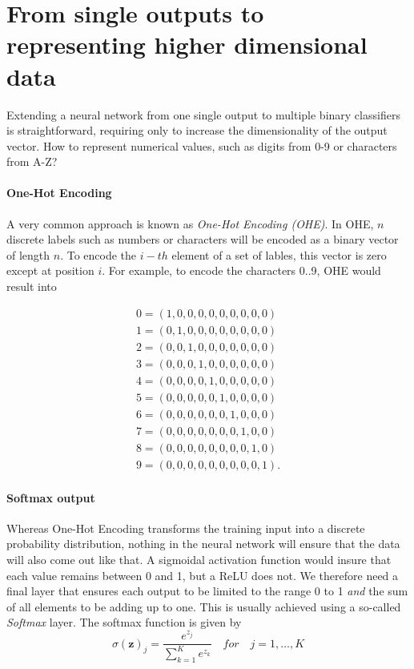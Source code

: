 \section{From single outputs to representing higher dimensional data}
Extending a neural network from one single output to multiple binary classifiers is straightforward, requiring only to increase the dimensionality of the output vector. How to represent numerical values, such as digits from 0-9 or characters from A-Z?


\paragraph{One-Hot Encoding}  A very common approach is known as \textsl{One-Hot Encoding (OHE)}. In OHE, $n$ discrete labels such as numbers or characters will be encoded as a binary vector of length $n$. To encode the $i-th$ element of a set of lables, this vector is zero except at position $i$. For example, to encode the characters 0..9, OHE would result into

\begin{eqnarray}
\nonumber
0 = (1,0,0,0,0,0,0,0,0,0)\\
\nonumber
1 = (0,1,0,0,0,0,0,0,0,0)\\
\nonumber
2 = (0,0,1,0,0,0,0,0,0,0)\\
\nonumber
3 = (0,0,0,1,0,0,0,0,0,0)\\
\nonumber
4 = (0,0,0,0,1,0,0,0,0,0)\\
\nonumber
5 = (0,0,0,0,0,1,0,0,0,0)\\
\nonumber
6 = (0,0,0,0,0,0,1,0,0,0)\\
\nonumber
7 = (0,0,0,0,0,0,0,1,0,0)\\
\nonumber
8 = (0,0,0,0,0,0,0,0,1,0)\\
\nonumber
9 = (0,0,0,0,0,0,0,0,0,1).
\end{eqnarray}

\paragraph{Softmax output} Whereas One-Hot Encoding transforms the training input into a discrete probability distribution, nothing in the neural network will ensure that the data will also come out like that. A sigmoidal activation function would insure that each value remains between 0 and 1, but a ReLU does not. We therefore need a final layer that ensures each output to be limited to the range 0 to 1 \textsl{and} the sum of all elements to be adding up to one. This is usually achieved using a so-called \textsl{Softmax} layer. The softmax function is given by
\begin{equation}
{\sigma (\mathbf {z} )_{j}={\frac {e^{z_{j}}}{\sum _{k=1}^{K}e^{z_{k}}}}} \quad for \quad j=1,\ldots,K
\end{equation}

